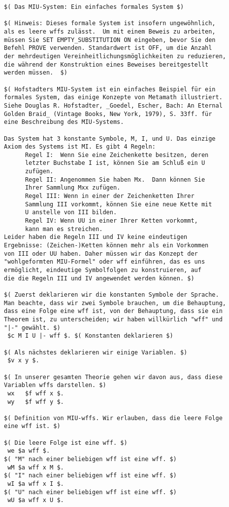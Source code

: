 \begin{verbatim}
$( Das MIU-System: Ein einfaches formales System $)

$( Hinweis: Dieses formale System ist insofern ungewöhnlich,
als es leere wffs zulässt.  Um mit einem Beweis zu arbeiten,
müssen Sie SET EMPTY_SUBSTITUTION ON eingeben, bevor Sie den
Befehl PROVE verwenden. Standardwert ist OFF, um die Anzahl
der mehrdeutigen Vereinheitlichungsmöglichkeiten zu reduzieren,
die während der Konstruktion eines Beweises bereitgestellt
werden müssen.  $)

$( Hofstadters MIU-System ist ein einfaches Beispiel für ein
formales System, das einige Konzepte von Metamath illustriert.
Siehe Douglas R. Hofstadter, _Goedel, Escher, Bach: An Eternal
Golden Braid_ (Vintage Books, New York, 1979), S. 33ff. für
eine Beschreibung des MIU-Systems.

Das System hat 3 konstante Symbole, M, I, und U. Das einzige
Axiom des Systems ist MI. Es gibt 4 Regeln:
      Regel I:  Wenn Sie eine Zeichenkette besitzen, deren
      letzter Buchstabe I ist, können Sie am Schluß ein U
      zufügen.
      Regel II: Angenommen Sie haben Mx.  Dann können Sie
      Ihrer Sammlung Mxx zufügen.
      Regel III: Wenn in einer der Zeichenketten Ihrer
      Sammlung III vorkommt, können Sie eine neue Kette mit
      U anstelle von III bilden.
      Regel IV: Wenn UU in einer Ihrer Ketten vorkommt,
      kann man es streichen.
Leider haben die Regeln III und IV keine eindeutigen
Ergebnisse: (Zeichen-)Ketten können mehr als ein Vorkommen
von III oder UU haben. Daher müssen wir das Konzept der
"wohlgeformten MIU-Formel" oder wff einführen, das es uns
ermöglicht, eindeutige Symbolfolgen zu konstruieren, auf
die die Regeln III und IV angewendet werden können. $)

$( Zuerst deklarieren wir die konstanten Symbole der Sprache.
Man beachte, dass wir zwei Symbole brauchen, um die Behauptung,
dass eine Folge eine wff ist, von der Behauptung, dass sie ein
Theorem ist, zu unterscheiden; wir haben willkürlich "wff" und
"|-" gewählt. $)
 $c M I U |- wff $. $( Konstanten deklarieren $)

$( Als nächstes deklarieren wir einige Variablen. $)
 $v x y $.

$( In unserer gesamten Theorie gehen wir davon aus, dass diese
Variablen wffs darstellen. $)
 wx   $f wff x $.
 wy   $f wff y $.

$( Definition von MIU-wffs. Wir erlauben, dass die leere Folge
eine wff ist. $)

$( Die leere Folge ist eine wff. $)
 we $a wff $.
$( "M" nach einer beliebigen wff ist eine wff. $)
 wM $a wff x M $.
$( "I" nach einer beliebigen wff ist eine wff. $)
 wI $a wff x I $.
$( "U" nach einer beliebigen wff ist eine wff. $)
 wU $a wff x U $.


\end{verbatim}
